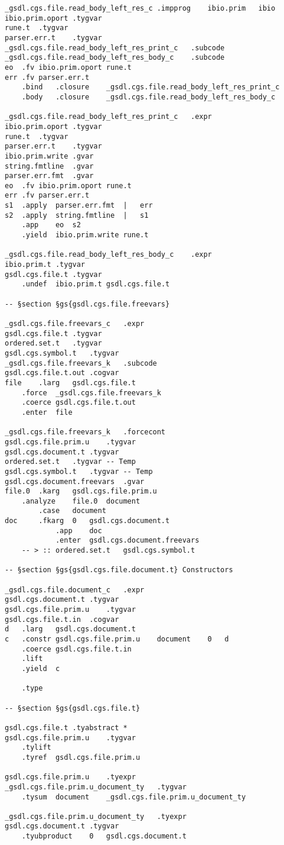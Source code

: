 \documentclass{report}
\begin{document}
\begin{verbatim}
_gsdl.cgs.file.read_body_left_res_c	.impprog	ibio.prim	ibio
ibio.prim.oport	.tygvar
rune.t	.tygvar
parser.err.t	.tygvar
_gsdl.cgs.file.read_body_left_res_print_c	.subcode
_gsdl.cgs.file.read_body_left_res_body_c	.subcode
eo	.fv	ibio.prim.oport	rune.t
err	.fv	parser.err.t
	.bind	.closure	_gsdl.cgs.file.read_body_left_res_print_c
	.body	.closure	_gsdl.cgs.file.read_body_left_res_body_c

_gsdl.cgs.file.read_body_left_res_print_c	.expr
ibio.prim.oport	.tygvar
rune.t	.tygvar
parser.err.t	.tygvar
ibio.prim.write	.gvar
string.fmtline	.gvar
parser.err.fmt	.gvar
eo	.fv	ibio.prim.oport	rune.t
err	.fv	parser.err.t
s1	.apply	parser.err.fmt	|	err
s2	.apply	string.fmtline	|	s1
	.app	eo	s2
	.yield	ibio.prim.write	rune.t

_gsdl.cgs.file.read_body_left_res_body_c	.expr
ibio.prim.t	.tygvar
gsdl.cgs.file.t	.tygvar
	.undef	ibio.prim.t	gsdl.cgs.file.t

-- §section §gs{gsdl.cgs.file.freevars}

_gsdl.cgs.file.freevars_c	.expr
gsdl.cgs.file.t	.tygvar
ordered.set.t	.tygvar
gsdl.cgs.symbol.t	.tygvar
_gsdl.cgs.file.freevars_k	.subcode
gsdl.cgs.file.t.out	.cogvar
file	.larg	gsdl.cgs.file.t
	.force	_gsdl.cgs.file.freevars_k
	.coerce	gsdl.cgs.file.t.out
	.enter	file

_gsdl.cgs.file.freevars_k	.forcecont
gsdl.cgs.file.prim.u	.tygvar
gsdl.cgs.document.t	.tygvar
ordered.set.t	.tygvar	-- Temp
gsdl.cgs.symbol.t	.tygvar	-- Temp
gsdl.cgs.document.freevars	.gvar
file.0	.karg	gsdl.cgs.file.prim.u
	.analyze	file.0	document
		.case	document
doc		.fkarg	0	gsdl.cgs.document.t
			.app	doc
			.enter	gsdl.cgs.document.freevars
	-- > :: ordered.set.t	gsdl.cgs.symbol.t

-- §section §gs{gsdl.cgs.file.document.t} Constructors

_gsdl.cgs.file.document_c	.expr
gsdl.cgs.document.t	.tygvar
gsdl.cgs.file.prim.u	.tygvar
gsdl.cgs.file.t.in	.cogvar
d	.larg	gsdl.cgs.document.t
c	.constr	gsdl.cgs.file.prim.u	document	0	d
	.coerce	gsdl.cgs.file.t.in
	.lift
	.yield	c

	.type

-- §section §gs{gsdl.cgs.file.t}

gsdl.cgs.file.t	.tyabstract	*
gsdl.cgs.file.prim.u	.tygvar
	.tylift
	.tyref	gsdl.cgs.file.prim.u

gsdl.cgs.file.prim.u	.tyexpr
_gsdl.cgs.file.prim.u_document_ty	.tygvar
	.tysum	document	_gsdl.cgs.file.prim.u_document_ty

_gsdl.cgs.file.prim.u_document_ty	.tyexpr
gsdl.cgs.document.t	.tygvar
	.tyubproduct	0	gsdl.cgs.document.t


\end{verbatim}
\end{document}
